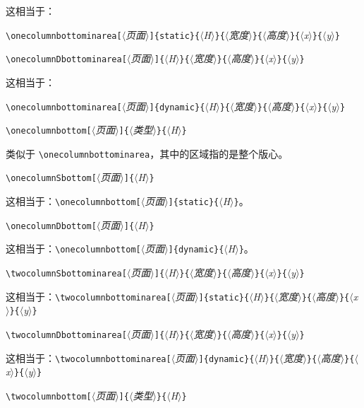 \documentclass[a4paper]{book}%
\newcommand{\meta}[1]{\textnormal{\ensuremath{\langle}\makebox[0pt][l]{}\emph{#1}\makebox[0pt][l]{}\ensuremath{\rangle}}}
\begin{document}
这相当于：
\begin{mdframed}[backgroundcolor=white]
    \verb|\onecolumnbottominarea[|\meta{页面}\verb|]{static}{|\meta{H}\verb|}{|\meta{宽度}\verb|}{|\meta{高度}\verb|}{|\meta{x}\verb|}{|\meta{y}\verb|}|
\end{mdframed}
\begin{mdframed}
    \verb|\onecolumnDbottominarea[|\meta{页面}\verb|]{|\meta{H}\verb|}{|\meta{宽度}\verb|}{|\meta{高度}\verb|}{|\meta{x}\verb|}{|\meta{y}\verb|}|
\end{mdframed}
这相当于：
\begin{mdframed}[backgroundcolor=white]
    \verb|\onecolumnbottominarea[|\meta{页面}\verb|]{dynamic}{|\meta{H}\verb|}{|\meta{宽度}\verb|}{|\meta{高度}\verb|}{|\meta{x}\verb|}{|\meta{y}\verb|}|
\end{mdframed}
\begin{mdframed}
    \verb|\onecolumnbottom[|\meta{页面}\verb|]{|\meta{类型}\verb|}{|\meta{H}\verb|}|
\end{mdframed}
类似于 \verb|\onecolumnbottominarea|，其中的区域指的是整个版心。
\begin{mdframed}
    \verb|\onecolumnSbottom[|\meta{页面}\verb|]{|\meta{H}\verb|}|
\end{mdframed}
这相当于：\verb|\onecolumnbottom[|\meta{页面}\verb|]{static}{|\meta{H}\verb|}|。
\begin{mdframed}
    \verb|\onecolumnDbottom[|\meta{页面}\verb|]{|\meta{H}\verb|}|
\end{mdframed}
这相当于：\verb|\onecolumnbottom[|\meta{页面}\verb|]{dynamic}{|\meta{H}\verb|}|。
\begin{mdframed}
    \verb|\twocolumnSbottominarea[|\meta{页面}\verb|]{|\meta{H}\verb|}{|\meta{宽度}\verb|}{|\meta{高度}\verb|}{|\meta{x}\verb|}{|\meta{y}\verb|}|
\end{mdframed}
这相当于：\verb|\twocolumnbottominarea[|\meta{页面}\verb|]{static}{|\meta{H}\verb|}{|\meta{宽度}\verb|}{|\meta{高度}\verb|}{|\meta{x}\verb|}{|\meta{y}\verb|}|
\begin{mdframed}
    \verb|\twocolumnDbottominarea[|\meta{页面}\verb|]{|\meta{H}\verb|}{|\meta{宽度}\verb|}{|\meta{高度}\verb|}{|\meta{x}\verb|}{|\meta{y}\verb|}|
\end{mdframed}
这相当于：\verb|\twocolumnbottominarea[|\meta{页面}\verb|]{dynamic}{|\meta{H}\verb|}{|\meta{宽度}\verb|}{|\meta{高度}\verb|}{|\meta{x}\verb|}{|\meta{y}\verb|}|
\begin{mdframed}
    \verb|\twocolumnbottom[|\meta{页面}\verb|]{|\meta{类型}\verb|}{|\meta{H}\verb|}|
\end{mdframed}
\end{document}
